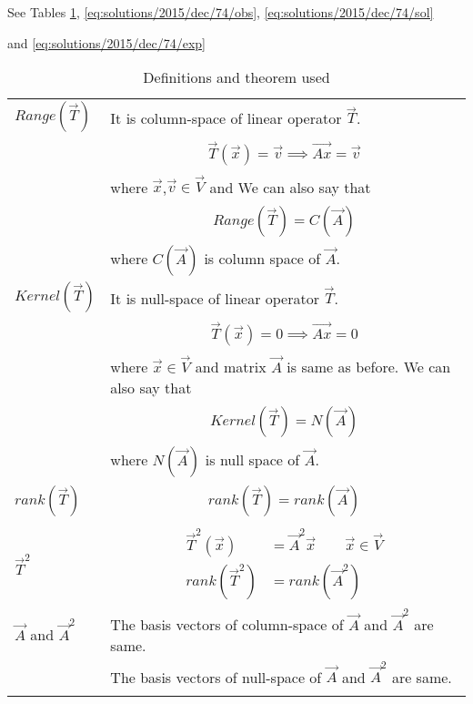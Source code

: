 See Tables \ref{eq:solutions/2015/dec/74/deftab}, \ref{eq:solutions/2015/dec/74/obs}, \ref{eq:solutions/2015/dec/74/sol}

and \ref{eq:solutions/2015/dec/74/exp}

%
\onecolumn
\begin{longtable}{|l|l|}
\hline
\endhead
$Range(\vec{T})$&It is column-space of linear operator $\vec{T}$.\\&\parbox{15cm}{\begin{align}
    \vec{T}(\vec{x})=\vec{v}
    \implies\vec{Ax}=\vec{v}
\end{align}}\\&where $\vec{x}$,$\vec{v}\in\vec{V}$ and We can also say that\\&\parbox{15cm}{\begin{align}
    Range(\vec{T})=C(\vec{A})\label{eq:solutions/2015/dec/74/R}
\end{align}}\\&where $C(\vec{A})$ is column space of $\vec{A}$.\\
\hline$Kernel(\vec{T})$&It is null-space of linear operator $\vec{T}$.\\&\parbox{15cm}{\begin{align}
    \vec{T}(\vec{x})=0
    \implies\vec{Ax}=0
\end{align}}\\&where $\vec{x}\in\vec{V}$ and matrix $\vec{A}$ is same as before. We can also say that\\&\parbox{15cm}{\begin{align}
    Kernel(\vec{T})=N(\vec{A})\label{eq:solutions/2015/dec/74/K}
\end{align}}\\&where $N(\vec{A})$ is null space of $\vec{A}$.\\
\hline$rank(\vec{T})$&\parbox{15cm}{\begin{align}
    rank(\vec{T})=rank(\vec{A})
\end{align}}\\
\hline$\vec{T}^2$&\parbox{15cm}{\begin{align}
    \vec{T}^2(\vec{x})&=\vec{A}^2\vec{x}\quad\quad\vec{x}\in\vec{V}\\
    rank(\vec{T}^2)&=rank(\vec{A}^2)
\end{align}}\\
\hline$\vec{A}$ and $\vec{A}^2$&The basis vectors of column-space of $\vec{A}$ and $\vec{A}^2$ are same.\\&The basis vectors of null-space of $\vec{A}$ and $\vec{A}^2$ are same.\\
\hline
\caption{Definitions and theorem used}
\label{eq:solutions/2015/dec/74/deftab}
\end{longtable}

